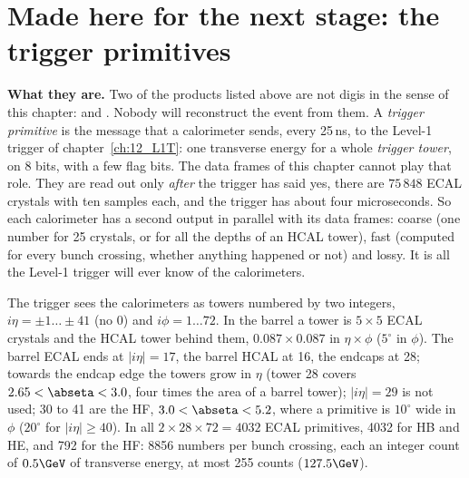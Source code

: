 \section{Made here for the next stage: the trigger primitives}
\label{sec:11_tp}

\textbf{What they are.} Two of the products listed above are not digis in the sense of this chapter:
 and . Nobody will reconstruct the event
from them. A \emph{trigger primitive} is the message that a calorimeter sends, every 25\,ns, to the Level-1 trigger
of chapter~\ref{ch:12_L1T}: one transverse energy for a whole \emph{trigger tower}, on 8 bits, with a few flag bits.
The data frames of this chapter cannot play that role. They are read out only \emph{after} the trigger has said
yes, there are $75\,848$ ECAL crystals with ten samples each, and the trigger has about four microseconds. So each
calorimeter has a second output in parallel with its data frames: coarse (one number for 25 crystals, or for all the
depths of an HCAL tower), fast (computed for every bunch crossing, whether anything happened or not) and lossy.
It is all the Level-1 trigger will ever know of the calorimeters.

\begin{plainwords}
The trigger sees the calorimeters as towers numbered by two integers, $i\eta=\pm1\ldots\pm41$ (no 0) and
$i\phi=1\ldots72$. In the barrel a tower is $5\times5$ ECAL crystals and the HCAL tower behind them,
$0.087\times0.087$ in $\eta\times\phi$ ($5^\circ$ in $\phi$). The barrel ECAL ends at $|i\eta|=17$, the barrel HCAL
at 16, the endcaps at 28; towards the endcap edge the towers grow in $\eta$ (tower 28 covers
$2.65<\abseta<3.0$, four times the area of a barrel tower); $|i\eta|=29$ is not used; 30 to 41 are the HF,
$3.0<\abseta<5.2$, where a primitive is $10^\circ$ wide in $\phi$ ($20^\circ$ for $|i\eta|\geq40$). In all
$2\times28\times72=4032$ ECAL primitives, 4032 for HB and HE, and 792 for the HF: 8856 numbers per bunch crossing,
each an integer count of $0.5\GeV$ of transverse energy, at most 255 counts ($127.5\GeV$).
\end{plainwords}

